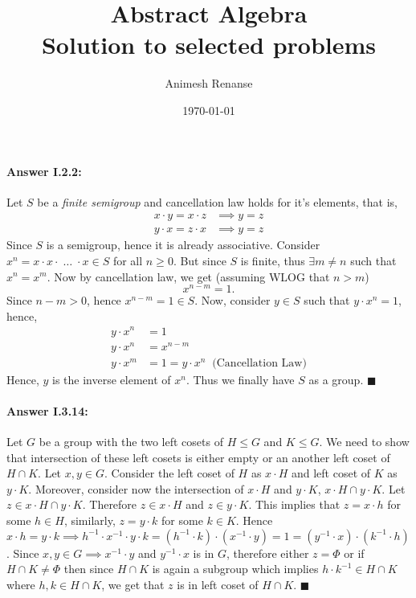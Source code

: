 \documentclass{article}
\title{Abstract Algebra \large\\
	 Solution to selected problems }
\author{Animesh Renanse}
\date{\today}
\theoremstyle{definition}
\theoremstyle{remark}
\theoremstyle{definition}
\theoremstyle{definition}
\newenvironment{customproof}[1]{\paragraph{Answer #1:}}{\hfill\ensuremath{\blacksquare}}
\newcommand{\intrs}{\cap}
\newcommand{\inv}[1]{#1^{-1}}
\begin{document}
	
	\maketitle
	\begin{customproof}{I.2.2}
		Let $ S $ be a \emph{finite semigroup} and cancellation law holds for it's elements, that is, 
		\begin{equation}
			\begin{split}
				x\cdot y = x\cdot z &\implies y = z \\
				y\cdot x = z \cdot x & \implies y=z
			\end{split}
		\end{equation}  
		Since $ S $ is a semigroup, hence it is already associative. Consider $ x^n = x\cdot x\cdot \; \dots \;\cdot x \in S$ for all $ n\ge 0 $. But since $ S $ is finite, thus $ \exists m \neq n $ such that $ x^n = x^m $. Now by cancellation law, we get (assuming WLOG that $ n>m $)
		\[x^{n-m} = 1.\]
		Since $ n-m>0 $, hence $ x^{n-m} = 1 \in S $. Now, consider $ y\in S $ such that $ y\cdot x^n = 1 $, hence,
		\begin{equation}
			\begin{split}
				y\cdot x^n &= 1\\
				y\cdot x^n&= x^{n-m}\\
				y\cdot x^m &= 1 = y\cdot x^n\;\;\text{(Cancellation Law)}
			\end{split}
		\end{equation} 
		Hence, $ y $ is the inverse element of $ x^n $. Thus we finally have $ S $ as a group.
	\end{customproof}

\hrulefill
\begin{customproof}{I.3.14}
	Let $ G $ be a group with the two left cosets of $ H\le G $ and $ K\le G $. We need to show that intersection of these left cosets is either empty or an another left coset of $ H \intrs K $. Let $ x,y \in G $. Consider the left coset of $ H $ as $ x\cdot H $ and left coset of $ K $ as $ y\cdot K $. Moreover, consider now the intersection of $ x\cdot H $ and $ y\cdot K $, $ x \cdot H \intrs y\cdot K  $. Let $ z \in x \cdot H \intrs y\cdot K $. Therefore $ z \in x\cdot H $ and $ z\in  y\cdot K  $. This implies that $ z = x\cdot h $ for some $ h\in H $, similarly, $ z = y\cdot k $ for some $ k \in K $. Hence $ x\cdot h = y\cdot k \implies \inv{h}\cdot \inv{x}\cdot y\cdot k = (\inv{h}\cdot k)\cdot (\inv{x}\cdot y) =1 = (\inv{y}\cdot x)\cdot (\inv{k}\cdot h)$. Since $ x,y\in G \implies \inv{x}\cdot y$ and $ \inv{y}\cdot x $ is in $ G $, therefore either $ z = \Phi $ or if $ H\intrs K \neq \Phi$ then since $ H\intrs K $ is again a subgroup which implies $ h\cdot \inv{k} \in H\intrs K $ where $ h,k \in H\intrs K $, we get that $ z $ is in left coset of $ H\intrs K $.
\end{customproof}
\end{document}

